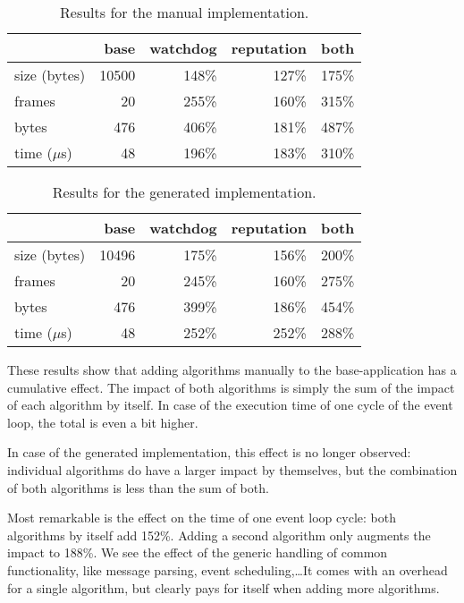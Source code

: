 \documentclass[conference]{IEEEtran}
\begin{document}
\begin{table}[H]
  \centering
  \begin{tabular}{lrrrr}
  \hline
      & base & watchdog & reputation & both\\
  \hline
  size (bytes) & 10500 & 148\% & 127\% & 175\%\\
  frames & 20 & 255\% & 160\% & 315\%\\
  bytes & 476 & 406\% & 181\% & 487\%\\
  time ($\mu$s) & 48 & 196\% & 183\% & 310\%\\
  \hline
  \end{tabular}
  \caption{Results for the manual implementation.}
  \label{tbl:manual}
\end{table}

\begin{table}[H]
  \centering
  \begin{tabular}{lrrrr}
  \hline
         & base & watchdog & reputation & both\\
  \hline
  size (bytes) & 10496 & 175\% & 156\% & 200\%\\
  frames & 20 & 245\% & 160\% & 275\%\\
  bytes & 476 & 399\% & 186\% & 454\%\\
  time ($\mu$s) & 48 & 252\% & 252\% & 288\%\\
  \hline
  \end{tabular}
  \caption{Results for the generated implementation.}
  \label{tbl:generated}
\end{table}

These results show that adding algorithms manually to the base-application has
a cumulative effect. The impact of both algorithms is simply the sum of the
impact of each algorithm by itself. In case of the execution time of one cycle
of the event loop, the total is even a bit higher.

In case of the generated implementation, this effect is no longer observed:
individual algorithms do have a larger impact by themselves, but the
combination of both algorithms is less than the sum of both.

Most remarkable is the effect on the time of one event loop cycle: both
algorithms by itself add 152\%. Adding a second algorithm only augments the
impact to 188\%. We see the effect of the generic handling of common
functionality, like message parsing, event scheduling,\dots It comes with an
overhead for a single algorithm, but clearly pays for itself when adding more
algorithms.
\end{document}
